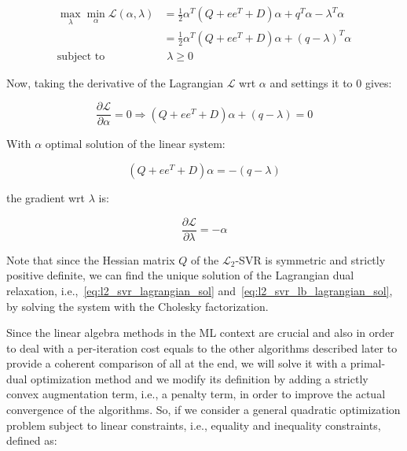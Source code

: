\begin{equation} \label{eq:l2_svr_lb_lagrangian_dual}
	\begin{aligned}
    	\max_{\lambda} \min_{\alpha} \mathcal{L}(\alpha,\lambda) &= \frac{1}{2} \alpha^T (Q + ee^T + D) \alpha+q^T\alpha - \lambda^T \alpha \\
    &= \frac{1}{2} \alpha^T (Q + ee^T + D)\alpha + (q - \lambda)^T \alpha \\
    \text{subject to} \quad & \,\, \lambda \geq 0
	\end{aligned}
\end{equation}

Now, taking the derivative of the Lagrangian $\mathcal{L}$ wrt $\alpha$ and settings it to 0 gives:

\begin{equation} \label{eq:l2_svr_lb_lagrangian_der_a}
	\frac{\partial \mathcal{L}}{\partial \alpha}=0\Rightarrow (Q + ee^T + D) \alpha + (q - \lambda) = 0
\end{equation}

With $\alpha$ optimal solution of the linear system:

\begin{equation} \label{eq:l2_svr_lb_lagrangian_sol}
    (Q + ee^T + D) \alpha = - (q - \lambda)
\end{equation}

the gradient wrt $\lambda$ is:

\begin{equation} \label{eq:l2_svr_lb_lagrangian_der_l}
    \frac{\partial \mathcal{L}}{\partial \lambda}=-\alpha
\end{equation}

\bigskip

Note that since the Hessian matrix $Q$ of the $\mathcal{L}_2$-SVR is symmetric and strictly positive definite, we can find the unique solution of the Lagrangian dual relaxation, i.e.,~\ref{eq:l2_svr_lagrangian_sol} and~\ref{eq:l2_svr_lb_lagrangian_sol}, by solving the system with the Cholesky factorization.

\bigskip

Since the linear algebra methods in the ML context are crucial and also in order to deal with a per-iteration cost equals to the other algorithms described later to provide a coherent comparison of all at the end, we will solve it with a primal-dual optimization method and we modify its definition by adding a strictly convex augmentation term, i.e., a penalty term, in order to improve the actual convergence of the algorithms. So, if we consider a general quadratic optimization problem subject to linear constraints, i.e., equality and inequality constraints, defined as:

